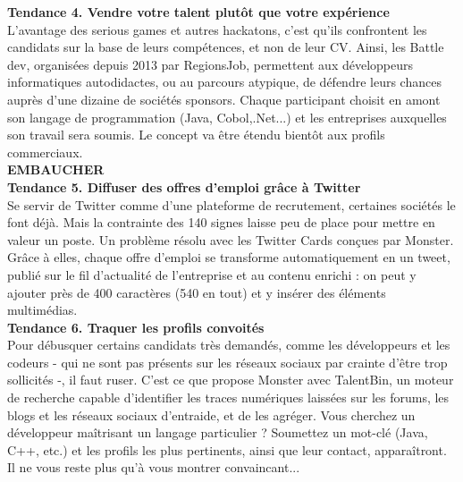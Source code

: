 \documentclass[11pt,twoside,a4paper]{article}
\begin{document}
\textbf{Tendance 4. Vendre votre talent plut{\^o}t que votre exp{\'e}rience}~\\

L'avantage des serious games et autres hackatons, c'est qu'ils confrontent les candidats sur la base de leurs comp{\'e}tences, et non de leur CV. Ainsi, les Battle dev, organis{\'e}es depuis 2013 par RegionsJob, permettent aux d{\'e}veloppeurs informatiques autodidactes, ou au parcours atypique, de d{\'e}fendre leurs chances aupr{\`e}s d'une dizaine de soci{\'e}t{\'e}s sponsors. Chaque participant choisit en amont son langage de programmation (Java, Cobol,.Net...) et les entreprises auxquelles son travail sera soumis. Le concept va {\^e}tre {\'e}tendu bient{\^o}t aux profils commerciaux. ~\\

\textbf{\textsc{EMBAUCHER}}~\\

\textbf{Tendance 5. Diffuser des offres d'emploi gr{\^a}ce {\`a} Twitter}~\\

Se servir de Twitter comme d'une plateforme de recrutement, certaines soci{\'e}t{\'e}s le font d{\'e}j{\`a}. Mais la contrainte des 140 signes laisse peu de place pour mettre en valeur un poste. Un probl{\`e}me r{\'e}solu avec les Twitter Cards con\c{c}ues par Monster. Gr{\^a}ce {\`a} elles, chaque offre d'emploi se transforme automatiquement en un tweet, publi{\'e} sur le fil d'actualit{\'e} de l'entreprise et au contenu enrichi : on peut y ajouter pr{\`e}s de 400 caract{\`e}res (540 en tout) et y ins{\'e}rer des {\'e}l{\'e}ments multim{\'e}dias. ~\\

\textbf{Tendance 6. Traquer les profils convoit{\'e}s}~\\

Pour d{\'e}busquer certains candidats tr{\`e}s demand{\'e}s, comme les d{\'e}veloppeurs et les codeurs - qui ne sont pas pr{\'e}sents sur les r{\'e}seaux sociaux par crainte d'{\^e}tre trop sollicit{\'e}s -, il faut ruser. C'est ce que propose Monster avec TalentBin, un moteur de recherche capable d'identifier les traces num{\'e}riques laiss{\'e}es sur les forums, les blogs et les r{\'e}seaux sociaux d'entraide, et de les agr{\'e}ger. Vous cherchez un d{\'e}veloppeur ma{\^i}trisant un langage particulier ? Soumettez un mot-cl{\'e} (Java, C++, etc.) et les profils les plus pertinents, ainsi que leur contact, appara{\^i}tront. Il ne vous reste plus qu'{\`a} vous montrer convaincant... ~\\
\end{document}
